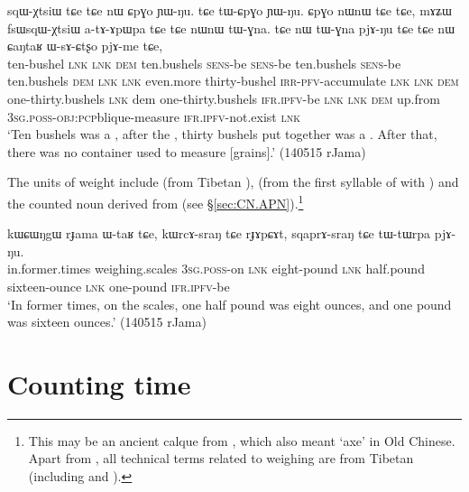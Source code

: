 \begin{exe}
\ex \label{ex:sqWXtsiW}
\gll sqɯ-χtsiɯ tɕe tɕe nɯ ɕpɣo ɲɯ-ŋu. tɕe tɯ-ɕpɣo ɲɯ-ŋu. ɕpɣo nɯnɯ tɕe tɕe, mɤʑɯ fsɯsqɯ-χtsiɯ a-tɤ-ɤpɯpa tɕe tɕe nɯnɯ tɯ-ɣna. tɕe nɯ tɯ-ɣna pjɤ-ŋu tɕe tɕe nɯ ɕaŋtaʁ ɯ-sɤ-ɕtʂo pjɤ-me tɕe, \\
ten-bushel \textsc{lnk} \textsc{lnk} \textsc{dem} ten.bushels \textsc{sens}-be \textsc{sens}-be ten.bushels \textsc{sens}-be ten.bushels  \textsc{dem} \textsc{lnk} \textsc{lnk} even.more thirty-bushel \textsc{irr}-\textsc{pfv}-accumulate \textsc{lnk} \textsc{lnk} \textsc{dem} one-thirty.bushels  \textsc{lnk} dem one-thirty.bushels \textsc{ifr}.\textsc{ipfv}-be \textsc{lnk} \textsc{lnk} \textsc{dem} up.from \textsc{3sg}.\textsc{poss}-\textsc{obj}:\textsc{pcp}blique-measure \textsc{ifr}.\textsc{ipfv}-not.exist \textsc{lnk} \\
\glt  `Ten bushels was a , after the , thirty bushels put together was a  . After that, there was no container used to measure [grains].'  (140515 rJama)
\end{exe}

The units of weight include  (from Tibetan ),   (from the first syllable of  with ) and the counted noun  derived from  (see §\ref{sec:CN.APN}).\footnote{This may be an ancient calque from , which also meant `axe' in Old Chinese. Apart from , all technical terms related to weighing are from Tibetan (including  and ). } 

\begin{exe}
\ex \label{ex:sqaprAsrang}
\gll kɯɕɯŋgɯ rɟama ɯ-taʁ tɕe, kɯrcɤ-sraŋ tɕe rɟɤpɕɤt,  sqaprɤ-sraŋ tɕe tɯ-tɯrpa pjɤ-ŋu. \\
in.former.times weighing.scales \textsc{3sg}.\textsc{poss}-on \textsc{lnk} eight-pound \textsc{lnk} half.pound sixteen-ounce \textsc{lnk} one-pound \textsc{ifr}.\textsc{ipfv}-be \\
\glt  `In former times, on the scales, one half pound was eight ounces, and one pound was sixteen ounces.' (140515 rJama)
\end{exe}
 

\section{Counting time} \label{sec:time}
